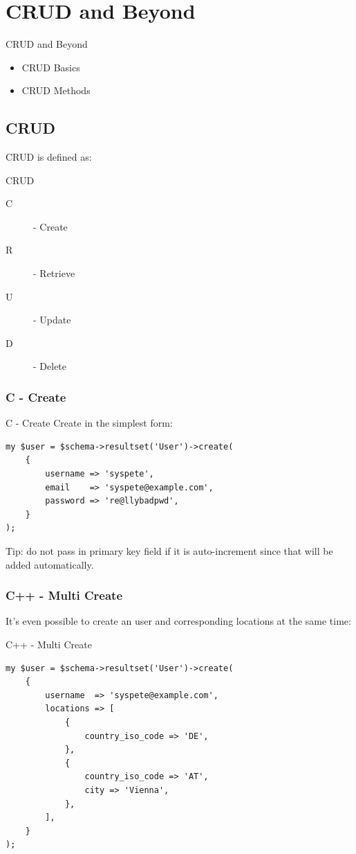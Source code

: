 \section{CRUD and Beyond}
\begin{frame}{CRUD and Beyond}
\begin{itemize}
\item CRUD Basics
\item CRUD Methods
\end{itemize}
\end{frame}

\subsection{CRUD}

CRUD is defined as:

\begin{frame}{CRUD}
\begin{description}
\item[C] - Create
\item[R] - Retrieve
\item[U] - Update
\item[D] - Delete
\end{description}
\end{frame}

\subsubsection{C - Create}
\begin{frame}[fragile]{C - Create}
Create in the simplest form:

\begin{lstlisting}
my $user = $schema->resultset('User')->create(
    {
        username => 'syspete',
        email    => 'syspete@example.com',
        password => 're@llybadpwd',
    }
);
\end{lstlisting}
\end{frame}

Tip: do not pass in primary key field if it is auto-increment since that will be added automatically.

\subsubsection{C++ - Multi Create}
It's even possible to create an user and corresponding locations at the
same time:

\begin{frame}[fragile]{C++ - Multi Create}
\begin{lstlisting}
my $user = $schema->resultset('User')->create(
    {
        username  => 'syspete@example.com',
        locations => [
            {
                country_iso_code => 'DE',
            },
            {
                country_iso_code => 'AT',
                city => 'Vienna',
            },
        ],
    }
);
\end{lstlisting}
\end{frame}

